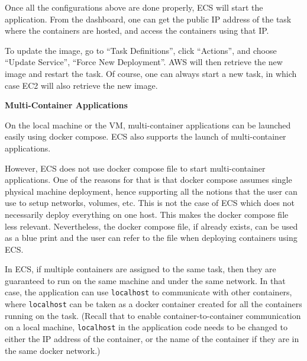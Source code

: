 Once all the configurations above are done properly, ECS will start the application. From the dashboard, one can get the public IP address of the task where the containers are hosted, and access the containers using that IP.

To update the image, go to ``Task Definitions'', click ``Actions'', and choose ``Update Service'', ``Force New Deployment''. AWS will then retrieve the new image and restart the task. Of course, one can always start a new task, in which case EC2 will also retrieve the new image. 

\vspace{0.1in}
\noindent \textbf{Multi-Container Applications}
\vspace{0.1in}


On the local machine or the VM, multi-container applications can be launched easily using docker compose. ECS also supports the launch of multi-container applications. 

However, ECS does not use docker compose file to start multi-container applications. One of the reasons for that is that docker compose assumes single physical machine deployment, hence supporting all the notions that the user can use to setup networks, volumes, etc. This is not the case of ECS which does not necessarily deploy everything on one host. This makes the docker compose file less relevant. Nevertheless, the docker compose file, if already exists, can be used as a blue print and the user can refer to the file when deploying containers using ECS.

In ECS, if multiple containers are assigned to the same task, then they are guaranteed to run on the same machine and under the same network. In that case, the application can use \verb|localhost| to communicate with other containers, where \verb|localhost| can be taken as a docker container created for all the containers running on the task. (Recall that to enable container-to-container communication on a local machine, \verb|localhost| in the application code needs to be changed to either the IP address of the container, or the name of the container if they are in the same docker network.)
























